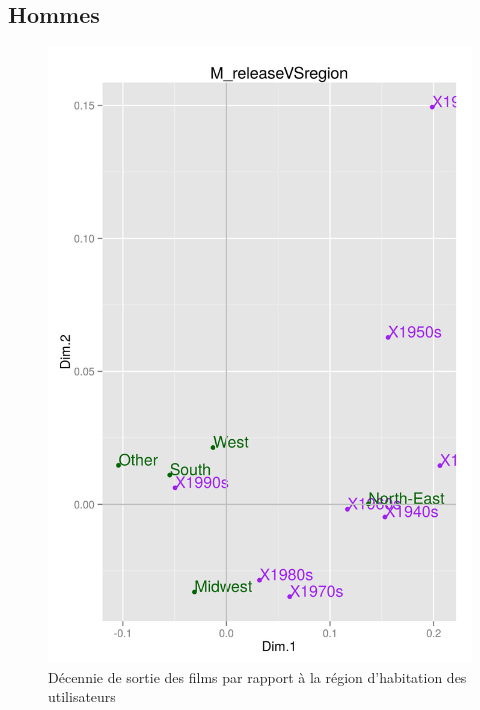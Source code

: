 \documentclass[11pt]{article}
\begin{document}
\subsection{Hommes}
\begin{figure}[htd]
\centering
\includegraphics[scale=0.65]{./images/M_releaseVSregion}
\caption{Décennie de sortie des films par rapport à la région d'habitation des utilisateurs}
\end{figure}
\end{document}
